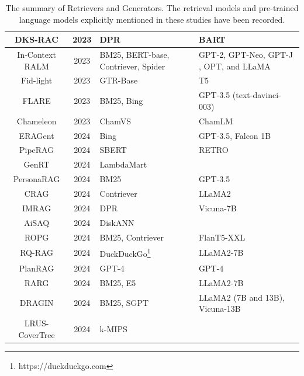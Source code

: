 \begin{table}
{\begin{tabular}{|c|c|m{5cm}|m{6cm}|}
			\hline
			DKS-RAC \cite{huang2023retrieval} & 2023 & DPR & BART \\ 
			\hline
			In-Context RALM \cite{ram2023incontext} & 2023 & BM25, BERT-base, Contriever, Spider \cite{ram2022learning} & GPT-2, GPT-Neo, GPT-J \cite{gao2021pile}, OPT, and LLaMA \\ 
			\hline
			Fid-light \cite{hofstätter2023fidlight} & 2023 & GTR-Base \cite{ni2022large} & T5 \\ 
			\hline
			FLARE \cite{jiang2023active} & 2023 & BM25, Bing & GPT-3.5 (text-davinci-003) \\
			\hline
			Chameleon \cite{jiang2023chameleon} & 2023 & ChamVS \cite{jiang2023chameleon} & ChamLM \cite{jiang2023chameleon} \\
			\hline
			ERAGent \cite{shi2024eragent} & 2024 & Bing & GPT-3.5, Falcon 1B \cite{penedo2023refinedweb} \\
			\hline
			PipeRAG \cite{jiang2024piperag} & 2024 & SBERT & RETRO \cite{borgeaud2022improving} \\
			\hline
			GenRT \cite{xu2024listaware} & 2024 & LambdaMart \cite{ai2018learning} &  \\
			\hline
			PersonaRAG \cite{zerhoudi2024personarag} & 2024 & BM25 & GPT-3.5\\
			\hline
			CRAG \cite{yan2024corrective} & 2024 & Contriever &  LLaMA2\\
			\hline
			IMRAG \cite{yang2024imrag} & 2024 & DPR & Vicuna-7B  \\
			\hline
			AiSAQ \cite{tatsuno2024aisaq} & 2024 & DiskANN \cite{pan2023lmdiskann} &  \\
			\hline
			ROPG \cite{salemi2024optimization} & 2024 & BM25, Contriever & FlanT5-XXL \\
			\hline
			RQ-RAG \cite{chan2024rqrag} & 2024 & DuckDuckGo\footnote{https://duckduckgo.com} & LLaMA2-7B \\
			\hline
			PlanRAG \cite{lee2024planrag} & 2024 & GPT-4 & GPT-4 \\
			\hline
			RARG \cite{yue2024evidencedriven} & 2024 & BM25, E5 \cite{wang2022text}& LLaMA2-7B  \\
			\hline 
			DRAGIN \cite{su2024dragin} & 2024 & BM25, SGPT \cite{muennighoff2022sgpt} & LLaMA2 (7B and 13B), Vicuna-13B  \\
			\hline
			LRUS-CoverTree \cite{ma2024reconsidering} & 2024 & k-MIPS & \\
			\hline
		\end{tabular}
	}
	\caption{The summary of Retrievers and Generators. The retrieval models and pre-trained language models explicitly mentioned in these studies have been recorded.}
	\label{tab:regencomp}
\end{table}

